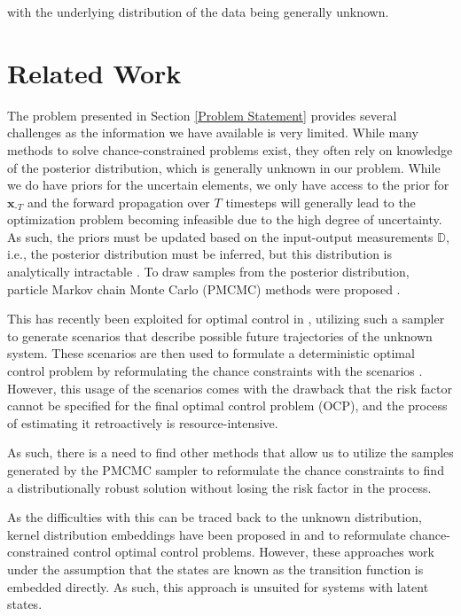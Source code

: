with the underlying distribution of the data being generally unknown.

\section{Related Work} \label{Related Work}


The problem presented in Section \ref{Problem Statement} provides several challenges as the information we have available is very limited. While many methods to solve chance-constrained problems exist, they often rely on knowledge of the posterior distribution, which is generally unknown in our problem. While we do have priors for the uncertain elements, we only have access to the prior for $\boldsymbol{x}_{\text{-}T}$ and the forward propagation over $T$ timesteps will generally lead to the optimization problem becoming infeasible due to the high degree of uncertainty. As such, the priors must be updated based on the input-output measurements $\mathbb{D}$, i.e., the posterior distribution must be inferred, but this distribution is analytically intractable \cite{Andrieu_10}. To draw samples from the posterior distribution, particle Markov chain Monte Carlo (PMCMC) methods were proposed \cite{Andrieu_10}. 

This has recently been exploited for optimal control in \cite{Robert_24}, utilizing such a sampler to generate scenarios that describe possible future trajectories of the unknown system. These scenarios are then used to formulate a deterministic optimal control problem by reformulating the chance constraints with the scenarios \cite{Garatti_22}. However, this usage of the scenarios comes with the drawback that the risk factor cannot be specified for the final optimal control problem (OCP), and the process of estimating it retroactively is resource-intensive.

As such, there is a need to find other methods that allow us to utilize the samples generated by the PMCMC sampler to reformulate the chance constraints to find a distributionally robust solution without losing the risk factor in the process. 

As the difficulties with this can be traced back to the unknown distribution, kernel distribution embeddings have been proposed in \cite{Adam_21} and \cite{Adam_22} to reformulate chance-constrained control optimal control problems. However, these approaches work under the assumption that the states are known as the transition function is embedded directly. As such, this approach is unsuited for systems with latent states.

